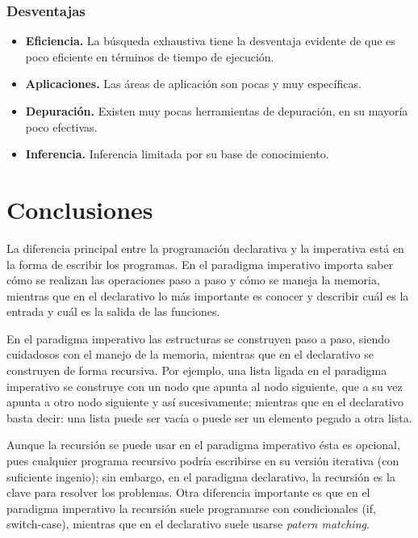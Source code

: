 \documentclass{article}
\begin{document}
\subsubsection*{Desventajas}

\begin{itemize}
\item \textbf{Eficiencia.} La búsqueda exhaustiva tiene la desventaja evidente de que es poco eficiente en términos de tiempo de ejecución.

\item \textbf{Aplicaciones.} Las áreas de aplicación son pocas y muy específicas.

\item \textbf{Depuración.} Existen muy pocas herramientas de depuración, en su mayoría poco efectivas.

\item \textbf{Inferencia.} Inferencia limitada por su base de conocimiento.

\end{itemize}

\section{Conclusiones}

La diferencia principal entre la programación declarativa y la imperativa está en la forma de escribir los programas. En el paradigma imperativo importa saber cómo se realizan las operaciones paso a paso y cómo se maneja la memoria, mientras que en el declarativo lo más importante es conocer y describir cuál es la entrada y cuál es la salida de las funciones.

En el paradigma imperativo las estructuras se construyen paso a paso, siendo cuidadosos con el manejo de la memoria, mientras que en el declarativo se construyen de forma recursiva. Por ejemplo, una lista ligada en el paradigma imperativo se construye con un nodo que apunta al nodo siguiente, que a su vez apunta a otro nodo siguiente y así sucesivamente; mientras que en el declarativo basta decir: una lista puede ser vacía o puede ser un elemento pegado a otra lista.

Aunque la recursión se puede usar en el paradigma imperativo ésta es opcional, pues cualquier programa recursivo podría escribirse en su versión iterativa (con suficiente ingenio); sin embargo, en el paradigma declarativo, la recursión es la clave para resolver los problemas. Otra diferencia importante es que en el paradigma imperativo la recursión suele programarse con condicionales (if, switch-case), mientras que en el declarativo suele usarse \textit{patern matching}.
\end{document}
